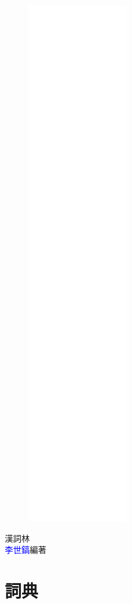 \documentclass[a5paper,12pt]{article}
\begin{document}
\linespread{1.25}
\begin{figure}
\includegraphics[height=230mm]{cover.png}
\end{figure}
\hfill
\vfill
{\fontsize{48}{48}\textcolor{deepblue}{漢詞林}}\\
{\textcolor{blue}{李世鎬}\hspace{14pt}編著}
\vspace{64pt}
\addtolength{\topmargin}{20mm}
\newpage
\linespread{1.25}


\section{詞典}

\printbibliography{}
\end{document}
